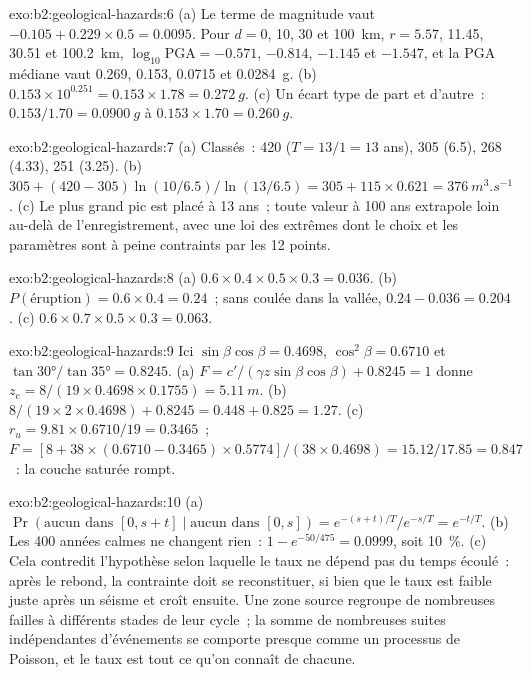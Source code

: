 \begin{solution}{exo:b2:geological-hazards:6}
(a) Le terme de magnitude vaut $-0.105 + 0.229 \times 0.5 = 0.0095$. Pour $d = 0$, 10, 30 et
\qty{100}{km}, $r = 5.57$, 11.45, 30.51 et \qty{100.2}{km}, $\log_{10}\mathrm{PGA} = -0.571$,
$-0.814$, $-1.145$ et $-1.547$, et la PGA médiane vaut 0.269, 0.153, 0.0715 et \qty{0.0284}{g}.
(b) $0.153 \times 10^{0.251} = 0.153 \times 1.78 = \qty{0.272}{g}$. (c) Un écart type de
part et d'autre~: $0.153/1.70 = \qty{0.0900}{g}$ à $0.153 \times 1.70 = \qty{0.260}{g}$.
\end{solution}

\begin{solution}{exo:b2:geological-hazards:7}
(a) Classés~: 420 ($T = 13/1 = 13$ ans), 305 (6.5), 268 (4.33), 251 (3.25). (b) $305 + (420 -
305)\ln(10/6.5)/\ln(13/6.5) = 305 + 115 \times 0.621 = \qty{376}{m^3.s^{-1}}$. (c) Le plus grand pic
est placé à 13 ans~; toute valeur à 100 ans extrapole loin au-delà de l'enregistrement, avec une loi des
extrêmes dont le choix et les paramètres sont à peine contraints par les 12 points.
\end{solution}

\begin{solution}{exo:b2:geological-hazards:8}
(a) $0.6 \times 0.4 \times 0.5 \times 0.3 = 0.036$. (b) $P(\text{éruption}) = 0.6 \times 0.4 = 0.24$~;
sans coulée dans la vallée, $0.24 - 0.036 = 0.204$. (c) $0.6 \times 0.7 \times 0.5 \times 0.3 =
0.063$.
\end{solution}

\begin{solution}{exo:b2:geological-hazards:9}
Ici $\sin\beta\cos\beta = 0.4698$, $\cos^2\beta = 0.6710$ et $\tan\ang{30}/\tan\ang{35} =
0.8245$. (a) $F = c'/(\gamma z\sin\beta\cos\beta) + 0.8245 = 1$ donne $z_c = 8/(19 \times 0.4698
\times 0.1755) = \qty{5.11}{m}$. (b) $8/(19 \times 2 \times 0.4698) + 0.8245 = 0.448 + 0.825 =
1.27$. (c) $r_u = 9.81 \times 0.6710/19 = 0.3465$~; $F = [8 + 38 \times (0.6710 - 0.3465) \times
0.5774]/(38 \times 0.4698) = 15.12/17.85 = 0.847$~: la couche saturée rompt.
\end{solution}

\begin{solution}{exo:b2:geological-hazards:10}
(a) $\Pr(\text{aucun dans } [0, s+t] \mid \text{aucun dans } [0, s]) = e^{-(s+t)/T}/e^{-s/T} = e^{-t/T}$.
(b) Les 400 années calmes ne changent rien~: $1 - e^{-50/475} = 0.0999$, soit \qty{10}{\percent}. (c) Cela
contredit l'hypothèse selon laquelle le taux ne dépend pas du temps écoulé~: après le rebond, la contrainte
doit se reconstituer, si bien que le taux est faible juste après un séisme et croît ensuite. Une zone source
regroupe de nombreuses failles à différents stades de leur cycle~; la somme de nombreuses suites indépendantes
d'événements se comporte presque comme un processus de Poisson, et le taux est tout ce qu'on connaît de chacune.
\end{solution}

